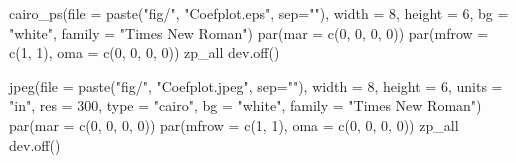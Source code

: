 \documentclass[
  letterpaper,
]{scrbook}
\newenvironment{Shaded}{\begin{snugshade}}{\end{snugshade}}
\newcommand{\AttributeTok}[1]{\textcolor[rgb]{0.40,0.45,0.13}{#1}}
\newcommand{\DecValTok}[1]{\textcolor[rgb]{0.68,0.00,0.00}{#1}}
\newcommand{\FunctionTok}[1]{\textcolor[rgb]{0.28,0.35,0.67}{#1}}
\newcommand{\NormalTok}[1]{\textcolor[rgb]{0.00,0.23,0.31}{#1}}
\newcommand{\StringTok}[1]{\textcolor[rgb]{0.13,0.47,0.30}{#1}}
\begin{document}
\begin{Shaded}
\begin{Highlighting}[]
\FunctionTok{cairo\_ps}\NormalTok{(}\AttributeTok{file =} \FunctionTok{paste}\NormalTok{(}\StringTok{"fig/"}\NormalTok{, }\StringTok{"Coefplot.eps"}\NormalTok{, }\AttributeTok{sep=}\StringTok{""}\NormalTok{), }\AttributeTok{width =} \DecValTok{8}\NormalTok{, }\AttributeTok{height =} \DecValTok{6}\NormalTok{, }
          \AttributeTok{bg =} \StringTok{"white"}\NormalTok{, }\AttributeTok{family =} \StringTok{"Times New Roman"}\NormalTok{)}
\FunctionTok{par}\NormalTok{(}\AttributeTok{mar =} \FunctionTok{c}\NormalTok{(}\DecValTok{0}\NormalTok{, }\DecValTok{0}\NormalTok{, }\DecValTok{0}\NormalTok{, }\DecValTok{0}\NormalTok{))}
\FunctionTok{par}\NormalTok{(}\AttributeTok{mfrow =} \FunctionTok{c}\NormalTok{(}\DecValTok{1}\NormalTok{, }\DecValTok{1}\NormalTok{), }\AttributeTok{oma =} \FunctionTok{c}\NormalTok{(}\DecValTok{0}\NormalTok{, }\DecValTok{0}\NormalTok{, }\DecValTok{0}\NormalTok{, }\DecValTok{0}\NormalTok{))}
\NormalTok{zp\_all}
\FunctionTok{dev.off}\NormalTok{()}

\FunctionTok{jpeg}\NormalTok{(}\AttributeTok{file =} \FunctionTok{paste}\NormalTok{(}\StringTok{"fig/"}\NormalTok{, }\StringTok{"Coefplot.jpeg"}\NormalTok{, }\AttributeTok{sep=}\StringTok{""}\NormalTok{), }\AttributeTok{width =} \DecValTok{8}\NormalTok{, }\AttributeTok{height =} \DecValTok{6}\NormalTok{, }
    \AttributeTok{units =} \StringTok{"in"}\NormalTok{, }\AttributeTok{res =} \DecValTok{300}\NormalTok{, }\AttributeTok{type =} \StringTok{"cairo"}\NormalTok{,}
          \AttributeTok{bg =} \StringTok{"white"}\NormalTok{, }\AttributeTok{family =} \StringTok{"Times New Roman"}\NormalTok{)}
\FunctionTok{par}\NormalTok{(}\AttributeTok{mar =} \FunctionTok{c}\NormalTok{(}\DecValTok{0}\NormalTok{, }\DecValTok{0}\NormalTok{, }\DecValTok{0}\NormalTok{, }\DecValTok{0}\NormalTok{))}
\FunctionTok{par}\NormalTok{(}\AttributeTok{mfrow =} \FunctionTok{c}\NormalTok{(}\DecValTok{1}\NormalTok{, }\DecValTok{1}\NormalTok{), }\AttributeTok{oma =} \FunctionTok{c}\NormalTok{(}\DecValTok{0}\NormalTok{, }\DecValTok{0}\NormalTok{, }\DecValTok{0}\NormalTok{, }\DecValTok{0}\NormalTok{))}
\NormalTok{zp\_all}
\FunctionTok{dev.off}\NormalTok{()}
\end{Highlighting}
\end{Shaded}
\end{document}
